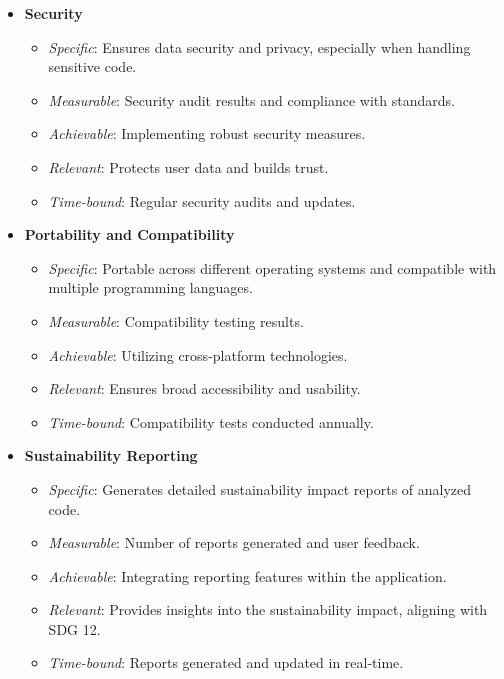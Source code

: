 \documentclass[conference,compsoc]{IEEEtran}
\begin{document}
\begin{itemize}
	\item \textbf{Security}
	      \begin{itemize}
		      \item \textit{Specific}: Ensures data security and privacy, especially when handling sensitive code.
		      \item \textit{Measurable}: Security audit results and compliance with standards.
		      \item \textit{Achievable}: Implementing robust security measures.
		      \item \textit{Relevant}: Protects user data and builds trust.
		      \item \textit{Time-bound}: Regular security audits and updates.
	      \end{itemize}

	\item \textbf{Portability and Compatibility}
	      \begin{itemize}
		      \item \textit{Specific}: Portable across different operating systems and compatible with multiple programming languages.
		      \item \textit{Measurable}: Compatibility testing results.
		      \item \textit{Achievable}: Utilizing cross-platform technologies.
		      \item \textit{Relevant}: Ensures broad accessibility and usability.
		      \item \textit{Time-bound}: Compatibility tests conducted annually.
	      \end{itemize}

	\item \textbf{Sustainability Reporting}
	      \begin{itemize}
		      \item \textit{Specific}: Generates detailed sustainability impact reports of analyzed code.
		      \item \textit{Measurable}: Number of reports generated and user feedback.
		      \item \textit{Achievable}: Integrating reporting features within the application.
		      \item \textit{Relevant}: Provides insights into the sustainability impact, aligning with SDG 12.
		      \item \textit{Time-bound}: Reports generated and updated in real-time.
	      \end{itemize}


\end{itemize}
\end{document}
